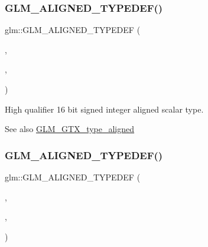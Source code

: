 \subsubsection{\texorpdfstring{G\+L\+M\+\_\+\+A\+L\+I\+G\+N\+E\+D\+\_\+\+T\+Y\+P\+E\+D\+E\+F()}{GLM\_ALIGNED\_TYPEDEF()}\hspace{0.1cm}{\footnotesize\ttfamily [30/209]}}
{\footnotesize\ttfamily glm\+::\+G\+L\+M\+\_\+\+A\+L\+I\+G\+N\+E\+D\+\_\+\+T\+Y\+P\+E\+D\+EF (\begin{DoxyParamCaption}\item[{\mbox{\hyperlink{group__gtc__type__precision_ga07d318d61472e75238e53b9642227672}{highp\+\_\+int16\+\_\+t}}}]{,  }\item[{aligned\+\_\+highp\+\_\+int16\+\_\+t}]{,  }\item[{2}]{ }\end{DoxyParamCaption})}

High qualifier 16 bit signed integer aligned scalar type. \begin{DoxySeeAlso}{See also}
\mbox{\hyperlink{group__gtx__type__aligned}{G\+L\+M\+\_\+\+G\+T\+X\+\_\+type\+\_\+aligned}} 
\end{DoxySeeAlso}
\mbox{\label{group__gtx__type__aligned_gaae773c28e6390c6aa76f5b678b7098a3}} 
\subsubsection{\texorpdfstring{G\+L\+M\+\_\+\+A\+L\+I\+G\+N\+E\+D\+\_\+\+T\+Y\+P\+E\+D\+E\+F()}{GLM\_ALIGNED\_TYPEDEF()}\hspace{0.1cm}{\footnotesize\ttfamily [31/209]}}
{\footnotesize\ttfamily glm\+::\+G\+L\+M\+\_\+\+A\+L\+I\+G\+N\+E\+D\+\_\+\+T\+Y\+P\+E\+D\+EF (\begin{DoxyParamCaption}\item[{\mbox{\hyperlink{group__gtc__type__precision_ga783d077a513c1f475f6cdb406b4238c3}{highp\+\_\+int32\+\_\+t}}}]{,  }\item[{aligned\+\_\+highp\+\_\+int32\+\_\+t}]{,  }\item[{4}]{ }\end{DoxyParamCaption})}

